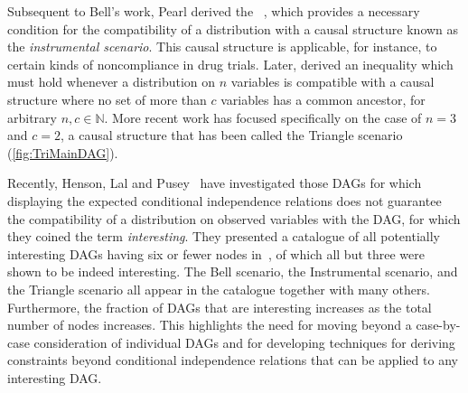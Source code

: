 \documentclass[aps,english,superscriptaddress,onecolumn,twoside,longbibliography,pra,floatfix,fleqn,nofootinbib]{revtex4-1}%
\newcommand*{\tblue}[1]{{\color{MidnightBlue}{\textbf{#1}}}}
\theoremstyle{definition}
\begin{document}
Subsequent to Bell's work, Pearl derived the \tblue{instrumental inequality}~\cite{pearl1995instrumental}, which provides a necessary condition for the compatibility of a distribution with a causal structure 
known as the \emph{instrumental scenario}.  This causal structure is applicable, for instance, to certain kinds of noncompliance in drug trials. Later, \citet{steudel2010ancestors} derived an inequality which must hold whenever a distribution on $n$
variables is compatible with a causal structure where no set of more
than $c$ variables has a common ancestor, for arbitrary $n,c \in \mathbb{N}$. More recent work has focused specifically on the case of $n=3$ and $c=2$, a causal structure that has been called the Triangle scenario~\cite{fritz2012bell,chaves2014novel} (\cref{fig:TriMainDAG}).

Recently, Henson, Lal and Pusey~\cite{pusey2014gdag} have investigated those DAGs for which displaying the expected conditional independence relations does not guarantee the compatibility of a distribution on observed variables with the DAG, for which they coined the term \emph{interesting}. They presented a catalogue of all potentially interesting DAGs having six or fewer nodes in~\cite[App.~E]{pusey2014gdag}, of which all but three were shown to be indeed interesting. The Bell scenario, the Instrumental scenario, and the Triangle scenario all appear in the catalogue together with many others.   Furthermore, the fraction of DAGs that are interesting increases as the total number of nodes increases.  This highlights the need for moving beyond a case-by-case consideration of individual DAGs and for developing techniques for deriving constraints beyond conditional independence relations that can be applied to any interesting DAG. 
\end{document}
